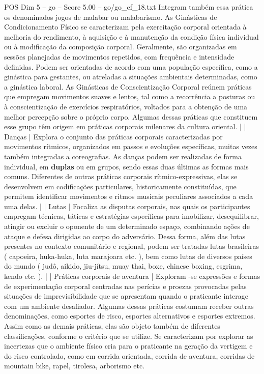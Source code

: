 \begin{textsample}{POS Dim 5 – go – Score 5.00 – go/go\_ef\_18.txt}
Integram também essa prática os denominados jogos de malabar ou malabarismo.
As Ginásticas de Condicionamento Físico se caracterizam pela exercitação corporal orientada à melhoria do rendimento, à aquisição e à manutenção da condição física individual ou à modificação da composição corporal.
Geralmente, são organizadas em sessões planejadas de movimentos repetidos, com frequência e intensidade definidas.
Podem ser orientadas de acordo com uma população específica, como a ginástica para gestantes, ou atreladas a situações ambientais determinadas, como a ginástica laboral.
As Ginásticas de Conscientização Corporal reúnem práticas que empregam movimentos suaves e lentos, tal como a recorrência a posturas ou à conscientização de exercícios respiratórios, voltados para a obtenção de uma melhor percepção sobre o próprio corpo.
Algumas dessas práticas que constituem esse grupo têm origem em práticas corporais milenares da cultura oriental. | | Danças | Explora o conjunto das práticas corporais caracterizadas por movimentos rítmicos, organizados em passos e evoluções específicas, muitas vezes também integradas a coreografias.
As danças podem ser realizadas de forma individual, em \textbf{duplas} ou em grupos, sendo essas duas últimas as formas mais comuns.
Diferentes de outras práticas corporais rítmico-expressivas, elas se desenvolvem em codificações particulares, historicamente constituídas, que permitem identificar movimentos e ritmos musicais peculiares associados a cada uma delas. | | Lutas | Focaliza as disputas corporais, nas quais os participantes empregam técnicas, táticas e estratégias específicas para imobilizar, desequilibrar, atingir ou excluir o oponente de um determinado espaço, combinando ações de ataque e defesa dirigidas ao corpo do adversário.
Dessa forma, além das lutas presentes no contexto comunitário e regional, podem ser tratadas lutas brasileiras ( capoeira, huka-huka, luta marajoara etc. ), bem como lutas de diversos países do mundo ( judô, aikido, jiu-jítsu, muay thai, boxe, chinese boxing, esgrima, kendo etc. ). | | Práticas corporais de aventura | Exploram -se expressões e formas de experimentação corporal centradas nas perícias e proezas provocadas pelas situações de imprevisibilidade que se apresentam quando o praticante interage com um ambiente desafiador.
Algumas dessas práticas costumam receber outras denominações, como esportes de risco, esportes alternativos e esportes extremos.
Assim como as demais práticas, elas são objeto também de diferentes classificações, conforme o critério que se utilize.
Se caracterizam por explorar as incertezas que o ambiente físico cria para o praticante na geração da vertigem e do risco controlado, como em corrida orientada, corrida de aventura, corridas de mountain bike, rapel, tirolesa, arborismo etc.

\end{textsample}
